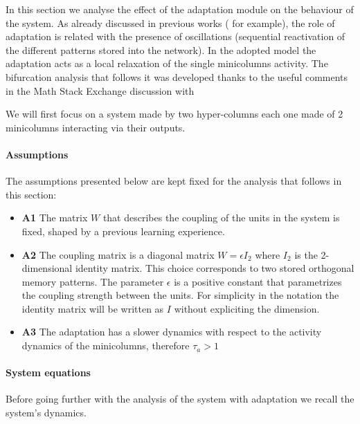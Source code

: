 In this section we analyse the effect of the adaptation module on the behaviour of the system. As already discussed in previous works (\cite{sandberg2002bayesian} for example), the role of adaptation is related with the presence of oscillations (sequential reactivation of the different patterns stored into the network). In the adopted model \cite{LansnerFRC} the adaptation acts as a local relaxation of the single minicolumns activity. The bifurcation analysis that follows it was developed thanks to the useful comments in the Math Stack Exchange discussion with \cite{stack_question}
 
 We will first focus on a system made by two hyper-columns each one made of 2 minicolumns interacting via their outputs.
 
 \paragraph{Assumptions}
 The assumptions presented below are kept fixed for the analysis that follows in this section:
 \begin{itemize}
     \item \textbf{A1} The matrix $W$ that describes the coupling of the units in the system is fixed, shaped by a previous learning experience.
     \item \textbf{A2} The coupling matrix is a diagonal matrix $W = \epsilon  I_{2}$ where $I_{2}$ is the 2-dimensional identity matrix. This choice corresponds to two stored orthogonal memory patterns. The parameter $\epsilon$ is a positive constant that parametrizes the coupling strength between the units. For simplicity in the notation the identity matrix will be written as $I$ without expliciting the dimension.
     \item \textbf{A3} The adaptation has a slower dynamics with respect to the activity dynamics of the minicolumns, therefore $\tau_a > 1$
 \end{itemize}
 
 \paragraph{System equations}
 Before going further with the analysis of the system with adaptation we recall the system's dynamics.
 
